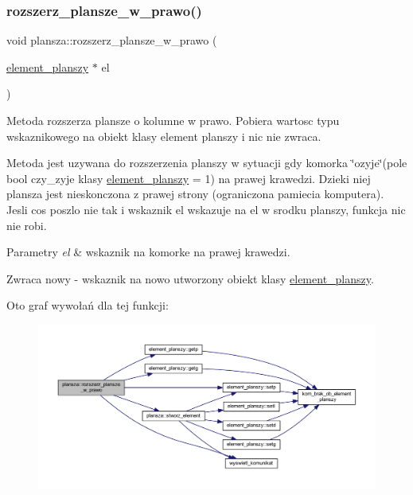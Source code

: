 \subsubsection{\texorpdfstring{rozszerz\+\_\+plansze\+\_\+w\+\_\+prawo()}{rozszerz\_plansze\_w\_prawo()}}
{\footnotesize\ttfamily void plansza\+::rozszerz\+\_\+plansze\+\_\+w\+\_\+prawo (\begin{DoxyParamCaption}\item[{\mbox{\hyperlink{classelement__planszy}{element\+\_\+planszy}} $\ast$}]{el }\end{DoxyParamCaption})}

Metoda rozszerza plansze o kolumne w prawo. Pobiera wartosc typu wskaznikowego na obiekt klasy element planszy i nic nie zwraca.

Metoda jest uzywana do rozszerzenia planszy w sytuacji gdy komorka \char`\"{}ozyje\char`\"{}(pole bool czy\+\_\+zyje klasy \mbox{\hyperlink{classelement__planszy}{element\+\_\+planszy}} = 1) na prawej krawedzi. Dzieki niej plansza jest nieskonczona z prawej strony (ograniczona pamiecia komputera). Jesli cos poszlo nie tak i wskaznik el wskazuje na el w srodku planszy, funkcja nic nie robi. 
\begin{DoxyParams}{Parametry}
{\em el} & wskaznik na komorke na prawej krawedzi. \\
\hline
\end{DoxyParams}
\begin{DoxyReturn}{Zwraca}
nowy -\/ wskaznik na nowo utworzony obiekt klasy \mbox{\hyperlink{classelement__planszy}{element\+\_\+planszy}}. 
\end{DoxyReturn}
Oto graf wywołań dla tej funkcji\+:
\nopagebreak
\begin{figure}[H]
\begin{center}
\leavevmode
\includegraphics[width=350pt]{classplansza_a50024fced2d5f43220cee76e77e54882_cgraph}
\end{center}
\end{figure}
